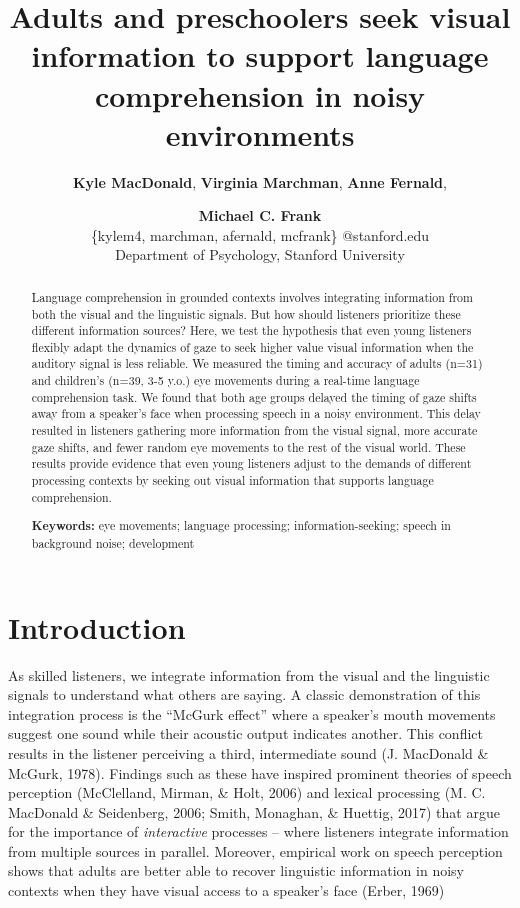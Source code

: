 \documentclass[10pt, letterpaper]{article}
\title{Adults and preschoolers seek visual information to support language
comprehension in noisy environments}
\author{{\large \bf Kyle MacDonald}, {\large \bf Virginia Marchman}, {\large \bf Anne Fernald}, \and {\large \bf Michael C. Frank} \\ \{kylem4, marchman, afernald, mcfrank\} @stanford.edu \\ Department of Psychology, Stanford University}
\begin{document}
\maketitle

\begin{abstract}
Language comprehension in grounded contexts involves integrating
information from both the visual and the linguistic signals. But how
should listeners prioritize these different information sources? Here,
we test the hypothesis that even young listeners flexibly adapt the
dynamics of gaze to seek higher value visual information when the
auditory signal is less reliable. We measured the timing and accuracy of
adults (n=31) and children's (n=39, 3-5 y.o.) eye movements during a
real-time language comprehension task. We found that both age groups
delayed the timing of gaze shifts away from a speaker's face when
processing speech in a noisy environment. This delay resulted in
listeners gathering more information from the visual signal, more
accurate gaze shifts, and fewer random eye movements to the rest of the
visual world. These results provide evidence that even young listeners
adjust to the demands of different processing contexts by seeking out
visual information that supports language comprehension.

\textbf{Keywords:}
eye movements; language processing; information-seeking; speech in
background noise; development
\end{abstract}

\section{Introduction}\label{introduction}

As skilled listeners, we integrate information from the visual and the
linguistic signals to understand what others are saying. A classic
demonstration of this integration process is the ``McGurk effect'' where
a speaker's mouth movements suggest one sound while their acoustic
output indicates another. This conflict results in the listener
perceiving a third, intermediate sound (J. MacDonald \& McGurk, 1978).
Findings such as these have inspired prominent theories of speech
perception (McClelland, Mirman, \& Holt, 2006) and lexical processing
(M. C. MacDonald \& Seidenberg, 2006; Smith, Monaghan, \& Huettig, 2017)
that argue for the importance of \emph{interactive} processes -- where
listeners integrate information from multiple sources in parallel.
Moreover, empirical work on speech perception shows that adults are
better able to recover linguistic information in noisy contexts when
they have visual access to a speaker's face (Erber, 1969)
\end{document}
